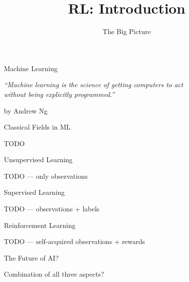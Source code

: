 


\title[Reinforcement Learning: Big Picture]{RL: Introduction}
\subtitle{The Big Picture}




	
	\maketitle

\begin{frame}[c]{Machine Learning}

\centering
\textit{``Machine learning is the science of getting computers to act\\
 without being explicitly programmed.''}

\hfill by Andrew Ng

\end{frame}
\begin{frame}[c]{Classical Fields in ML}

	TODO	
	
\end{frame}
\begin{frame}[c]{Unsupervised Learning}
	
	TODO	--- only observations
	
\end{frame}
\begin{frame}[c]{Supervised Learning}
	
	TODO	--- observations + labels
	
\end{frame}
\begin{frame}[c]{Reinforcement Learning}
	
	TODO	--- self-acquired observations + rewards
	
\end{frame}
\begin{frame}[c]{The Future of AI?}
	
	Combination of all three aspects?

\end{frame}

